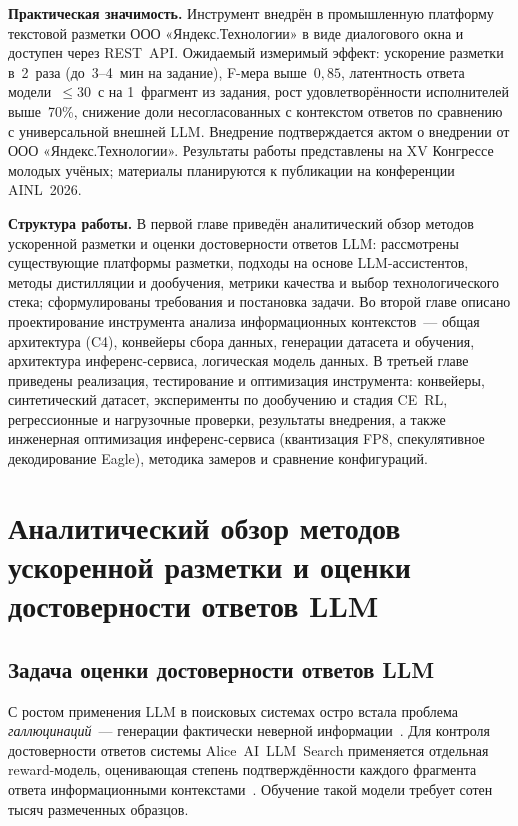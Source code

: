 \documentclass[times]{itmo-student-thesis}
\begin{document}
\textbf{Практическая значимость.} Инструмент внедрён в промышленную платформу
текстовой разметки ООО «Яндекс.Технологии» в виде диалогового окна и доступен
через REST~API. Ожидаемый измеримый эффект: ускорение разметки в~2~раза (до~3--4~мин на задание),
F-мера выше~$0{,}85$, латентность ответа модели~$\le 30$~с на 1~фрагмент из задания, рост удовлетворённости
исполнителей выше~70\%, снижение доли несогласованных с контекстом ответов
по сравнению с универсальной внешней LLM.
Внедрение подтверждается актом о внедрении от ООО «Яндекс.Технологии».
Результаты работы представлены на XV Конгрессе молодых учёных; материалы
планируются к публикации на конференции AINL~2026.

\textbf{Структура работы.} В первой главе приведён аналитический обзор методов
ускоренной разметки и оценки достоверности ответов LLM: рассмотрены
существующие платформы разметки, подходы на основе LLM-ассистентов, методы
дистилляции и дообучения, метрики качества и выбор технологического стека;
сформулированы требования и постановка задачи. Во второй главе описано
проектирование инструмента анализа информационных контекстов~--- общая
архитектура (C4), конвейеры сбора данных, генерации датасета и обучения,
архитектура инференс-сервиса, логическая модель данных. В третьей главе
приведены реализация, тестирование и оптимизация инструмента: конвейеры,
синтетический датасет, эксперименты по дообучению и стадия CE~RL,
регрессионные и нагрузочные проверки, результаты внедрения, а также
инженерная оптимизация инференс-сервиса (квантизация FP8, спекулятивное
декодирование Eagle), методика замеров и сравнение конфигураций.

\chapter{Аналитический обзор методов ускоренной разметки и оценки достоверности ответов LLM}

\startrelatedwork

\section{Задача оценки достоверности ответов LLM}

С ростом применения LLM в поисковых системах остро встала проблема
\emph{галлюцинаций}~--- генерации фактически неверной информации~\cite{minaee2024llm-survey,wei2022emergent}.
Для контроля достоверности ответов системы Alice~AI~LLM~Search
применяется отдельная reward-модель, оценивающая степень
подтверждённости каждого фрагмента ответа информационными
контекстами~\cite{zhao2023survey,lewis2020rag}. Обучение такой модели требует
сотен тысяч размеченных образцов.
\end{document}
